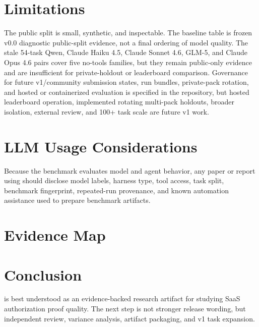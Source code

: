\documentclass[conference,compsoc]{IEEEtran}
\begin{document}
\section{Limitations}

The \releaseversion{} public split is small, synthetic, and inspectable. The
baseline table is frozen v0.0 diagnostic public-split evidence, not a final
ordering of model quality. The stale 54-task Qwen, Claude Haiku 4.5, Claude
Sonnet 4.6, GLM-5, and Claude Opus 4.6 pairs cover five no-tools families, but
they remain public-only evidence and are insufficient for private-holdout or
leaderboard comparison.
Governance for
future v1/community submission states, run bundles, private-pack rotation, and
hosted or containerized evaluation is specified in the repository, but hosted
leaderboard operation, implemented rotating multi-pack holdouts, broader
isolation, external review, and 100+ task scale are future v1 work.

\section{LLM Usage Considerations}

Because the benchmark evaluates model and agent behavior, any paper or report
using \benchmarkname{} should disclose model labels, harness type, tool access,
task split, benchmark fingerprint, repeated-run provenance, and known
automation assistance used to prepare benchmark artifacts.

\section{Evidence Map}

\begin{table}[t]
\centering
\caption{Claim evidence map generated from repository documentation.}

\end{table}

\section{Conclusion}

\benchmarkname{} \releaseversion{} is best understood as an evidence-backed
research artifact for studying SaaS authorization proof quality. The next step
is not stronger release wording, but independent review, variance analysis,
artifact packaging, and v1 task expansion.



\end{document}
